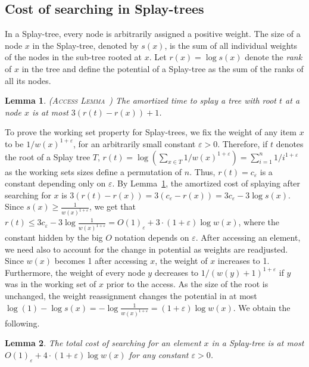 \documentclass[11pt]{article}       %
\newtheorem{lemma}{Lemma}
\begin{document}
\subsection{Cost of searching in Splay-trees}

In a Splay-tree, every node is arbitrarily assigned a positive weight.
The size of a node $x$ in the Splay-tree, denoted by $s(x)$, is the sum of all individual weights of the nodes in the sub-tree rooted at $x$. Let $r(x) = \log s(x)$ denote the \emph{rank}  of $x$ in the tree and define the potential of a Splay-tree as the sum of the ranks of all its nodes.

\begin{lemma}\label{lemma:Access lemma}(\textsc{Access Lemma}~\cite{sleator1985self})
The amortized time to splay a tree with root $t$ at a node $x$ is at most $3(r(t) - r(x)) + 1$.
\end{lemma}

To prove the working set property for Splay-trees, we fix the weight of any item $x$ to be $1/w(x)^{1+\varepsilon}$, for an arbitrarily small constant $\varepsilon > 0$.
Therefore, if $t$ denotes the root of a Splay tree $T$, $r(t) = \log (\sum_{x\in T} 1/w(x)^{1+\varepsilon}) = \sum_{i=1}^n  1/i^{1+\varepsilon}$ as the working sets sizes define a permutation of $n$. Thus, $r(t) = c_\varepsilon$ is a constant depending only on $\varepsilon$.
By Lemma~\ref{lemma:Access lemma}, the amortized cost of splaying after searching for $x$ is $3(r(t) - r(x)) = 3(c_\varepsilon - r(x)) = 3c_\varepsilon - 3\log s(x)$. Since $s(x) \geq \frac{1}{w(x)^{1+\varepsilon}}$, we get that $r(t) \leq  3c_\varepsilon - 3\log \frac{1}{w(x)^{1+\varepsilon}}  = O(1)_\varepsilon + 3\cdot (1+\varepsilon)\log w(x)$, where the constant hidden by the big $O$ notation depends on $\varepsilon$. 
After accessing an element, we need also to account for the change in potential as weights are readjusted. 
Since $w(x)$ becomes 1 after accessing $x$, the weight of $x$ increases to 1. Furthermore, the weight of every node $y$ decreases to $1/(w(y) +1)^{1+\varepsilon}$ if $y$ was in the working set of $x$ prior to the access.
As the size of the root is unchanged, the weight reassignment changes the potential in at most $\log (1)- \log s(x) = - \log \frac{1}{w(x)^{1+\varepsilon}} = (1+\varepsilon)\log w(x)$. 
We obtain the following.

\begin{lemma}\label{lemma:Splay-trees cost}
The total cost of searching for an element $x$ in a Splay-tree is at most \linebreak $O(1)_\varepsilon + 4\cdot (1+\varepsilon)\log w(x)$ for any constant $\varepsilon > 0$.
\end{lemma}
\end{document}

